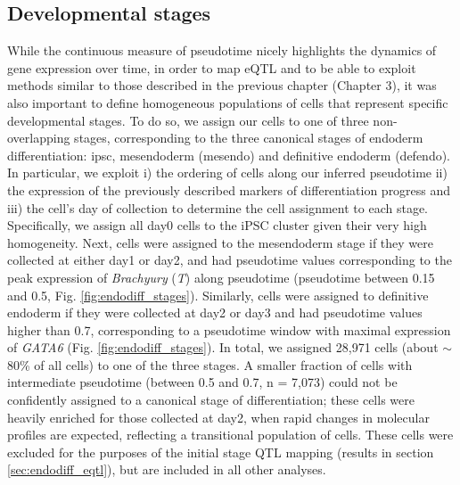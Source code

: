 \subsection{Developmental stages}

While the continuous measure of pseudotime nicely highlights the dynamics of gene expression over time, in order to map eQTL and to be able to exploit methods similar to those described in the previous chapter (Chapter 3), it was also important to define homogeneous populations of cells that represent specific developmental stages.
To do so, we assign our cells to one of three non-overlapping stages, corresponding to the three canonical stages of endoderm differentiation: \gls{ipsc}, mesendoderm (mesendo) and definitive endoderm (defendo).
In particular, we exploit i) the ordering of cells along our inferred pseudotime ii) the expression of the previously described markers of differentiation progress and iii) the cell's day of collection to determine the cell assignment to each stage.
Specifically, we assign all day0 cells to the iPSC cluster given their very high homogeneity.
Next, cells were assigned to the mesendoderm stage if they were collected at either day1 or day2, and had pseudotime values corresponding to the peak expression of \textit{Brachyury} (\textit{T}) along pseudotime (pseudotime between 0.15 and 0.5, Fig. \ref{fig:endodiff_stages}).  
Similarly, cells were assigned to definitive endoderm if they were collected at day2 or day3 and had pseudotime values higher than 0.7, corresponding to a pseudotime window with maximal expression of \textit{GATA6} (Fig. \ref{fig:endodiff_stages}).
In total, we assigned 28,971 cells (about $\sim$80\% of all cells) to one of the three stages. 
A smaller fraction of cells with intermediate pseudotime (between 0.5 and 0.7, n = 7,073) could not be confidently assigned to a canonical stage of differentiation; these cells were heavily enriched for those collected at day2, when rapid changes in molecular profiles are expected, reflecting a transitional population of cells.
These cells were excluded for the purposes of the initial stage QTL mapping (results in section \ref{sec:endodiff_eqtl}), but are included in all other analyses. 

